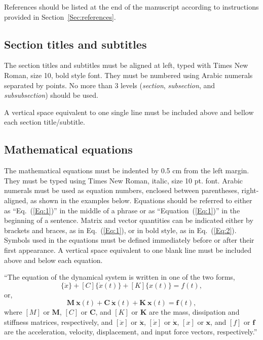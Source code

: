 \documentclass[10pt,fleqn,a4paper,twoside]{article}
\begin{document}
References should be listed at the end of the manuscript according to instructions provided in Section~\ref{Sec:references}.

\subsection{Section titles and subtitles}

The section titles and subtitles must be aligned at left, typed with Times New Roman, size 10, bold style font. They must be numbered using Arabic numerals separated by points. No more than 3 levels (\emph{section}, \emph{subsection}, and \emph{subsubsection}) should be used. 

A vertical space equivalent to one single line must be included above and bellow each section title/subtitle.

\subsection{Mathematical equations}

The mathematical equations must be indented by 0.5 cm from the left margin. They must be typed using Times New Roman, italic, size 10 pt. font. Arabic numerals must be used as equation numbers, enclosed between parentheses, right-aligned, as shown in the examples below. Equations should be referred to either as ``Eq.~(\ref{Eq:1})'' in the middle of a phrase or as ``Equation~(\ref{Eq:1})'' in the beginning of a sentence. Matrix and vector quantities can be indicated either by brackets and braces, as in Eq.~(\ref{Eq:1}), or in bold style, as in Eq.~(\ref{Eq:2}). Symbols used in the equations must be defined immediately before or after their first appearance. A vertical space equivalent to one blank line must be included above and below each equation.

``The equation of the dynamical system is written in one of the two forms,
\begin{equation}
[M]\{\ddot{x}\}+[C]\{\dot{x}(t)\}+[K]\{x(t)\}={f(t)},
\label{Eq:1}
\end{equation}
or,
\begin{equation}
\mathbf{M}\ \ddot{\mathbf{x}}(t)+\mathbf{C}\ \dot{\mathbf{x}}(t)+\mathbf{K}\ \mathbf{x}(t)=\mathbf{f}(t), 
\label{Eq:2}
\end{equation}
where $[M]$ or $\mathbf{M}$, $[C]$ or $\mathbf{C}$, and $[K]$ or $\mathbf{K}$ are the mass, dissipation and stiffness matrices, respectively, and $[\ddot{x}]$ or $\ddot{\mathbf{x}}$, $[\dot{x}]$ or $\dot{\mathbf{x}}$, $[x]$ or $\mathbf{x}$, and $[f]$ or $\mathbf{f}$ are the acceleration, velocity, displacement, and input force vectors, respectively.''
\end{document}
